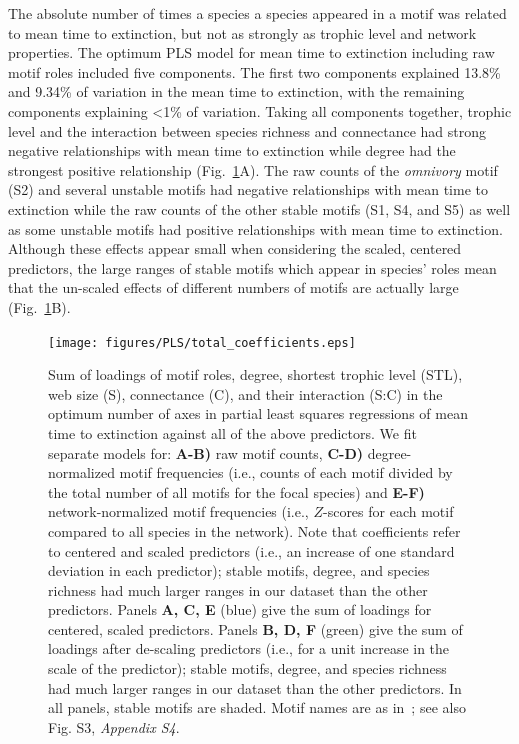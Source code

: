 \documentclass[12pt]{article}
\begin{document}
            The absolute number of times a species a species appeared in a motif was related to mean time to extinction, but not as strongly as trophic level and network properties.
            The optimum PLS model for mean time to extinction including raw motif roles included five components.
            The first two components explained 13.8\% and 9.34\% of variation in the mean time to extinction, with the remaining components explaining \textless1\% of variation.
            Taking all components together, trophic level and the interaction between species richness and connectance had strong negative relationships with mean time to extinction while degree had the strongest positive relationship (Fig.~\ref{coefficient_sum}A).
            The raw counts of the \emph{omnivory} motif (S2) and several unstable motifs had negative relationships with mean time to extinction while
            the raw counts of the other stable motifs (S1, S4, and S5) as well as some unstable motifs had positive relationships with mean time to extinction.
            Although these effects appear small when considering the scaled, centered predictors, the large ranges of stable motifs which appear in species' roles mean that the un-scaled effects of different numbers of motifs are actually large (Fig.~\ref{coefficient_sum}B).


            \begin{figure}[h!]      
            \caption{Sum of loadings of motif roles, degree, shortest trophic level (STL), web size (S), connectance (C), and their interaction (S:C) in the optimum number of axes in partial least squares regressions of mean time to extinction against all of the above predictors. We fit separate models for: \textbf{A-B)} raw motif counts, \textbf{C-D)} degree-normalized motif frequencies (i.e., counts of each motif divided by the total number of all motifs for the focal species) and \textbf{E-F)} network-normalized motif frequencies (i.e., $Z$-scores for each motif compared to all species in the network). Note that coefficients refer to centered and scaled predictors (i.e., an increase of one standard deviation in each predictor); stable motifs, degree, and species richness had much larger ranges in our dataset than the other predictors.
                Panels \textbf{A, C, E} (blue) give the sum of loadings for centered, scaled predictors.
                Panels \textbf{B, D, F} (green) give the sum of loadings after de-scaling predictors (i.e., for a unit increase in the scale of the predictor); stable motifs, degree, and species richness had much larger ranges in our dataset than the other predictors.
                In all panels, stable motifs are shaded. Motif names are as in~\citet{Stouffer2007}; see also Fig. S3, \emph{Appendix S4}.}
                \label{coefficient_sum}
                \texttt{[image: figures/PLS/total\_coefficients.eps]}
                \end{figure}
                
\end{document}
